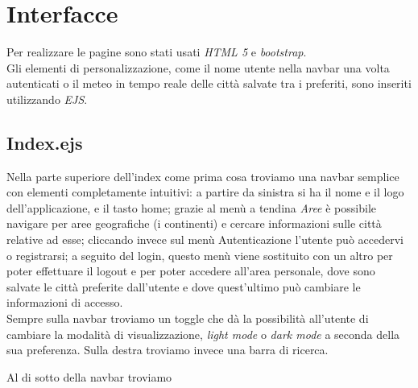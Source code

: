 \chapter{Interfacce}

Per realizzare le pagine sono stati usati \emph{HTML 5} e \emph{bootstrap}.\\
Gli elementi di personalizzazione, come il nome utente nella navbar una volta autenticati o il meteo
in tempo reale delle città salvate tra i preferiti, sono inseriti utilizzando \emph{EJS}.

\section{Index.ejs}

Nella parte superiore dell'index come prima cosa troviamo una navbar semplice con elementi completamente intuitivi: a partire da sinistra si ha il nome e il logo dell'applicazione,
e il tasto home; grazie al menù a tendina \emph{Aree} è possibile navigare per aree geografiche (i continenti) e cercare informazioni sulle città relative ad esse; cliccando invece sul menù {Autenticazione}
l'utente può accedervi o registrarsi; a seguito del login, questo menù viene sostituito con un altro per poter effettuare il logout e per poter accedere all'area personale, dove sono salvate le città
preferite dall'utente e dove quest'ultimo può cambiare le informazioni di accesso. \\
Sempre sulla navbar troviamo un toggle che dà la possibilità all'utente di cambiare la modalità di visualizzazione,
\emph{light mode} o \emph{dark mode} a seconda della sua preferenza. Sulla destra troviamo invece una barra di ricerca.

\vspace{5mm}

Al di sotto della navbar troviamo